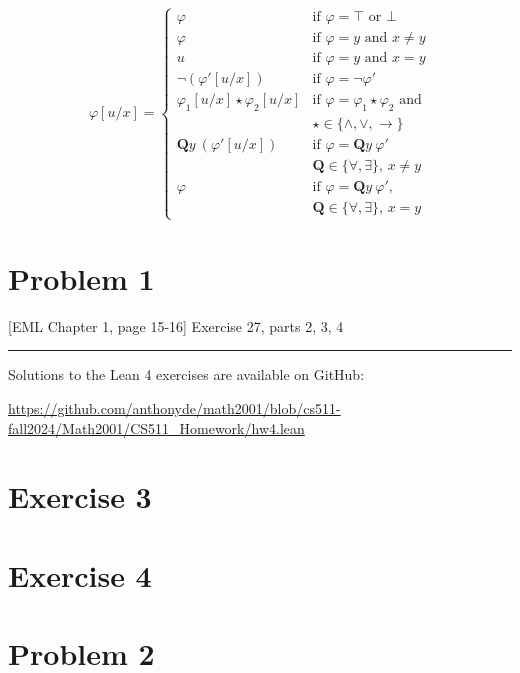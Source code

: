 \documentclass[12pt,leqno]{article}
\begin{document}
\[
  \varphi[u/x] = \left\{
    \begin{array}{ll}
    \varphi              & \text{if $\varphi = \top$ or $\bot$} \\
    \varphi              & \text{if $\varphi = y$ and $x \ne y$} \\
    u                    & \text{if $\varphi = y$ and $x = y$} \\
    \lnot(\varphi'[u/x]) & \text{if $\varphi = \lnot \varphi'$} \\
    \varphi_1[u/x] \star \varphi_2[u/x] &
      \text{if $\varphi = \varphi_1 \star \varphi_2$ and} \\
      & \text{$\star \in \{\land, \lor, \to\}$} \\
    \mathbf{Q}y\ (\varphi'[u/x])
      & \text{if $\varphi = \mathbf{Q}y\ \varphi'$} \\
      & \text{$\mathbf{Q} \in \{\forall, \exists\}$, $x \ne y$} \\
    \varphi & \text{if $\varphi = \mathbf{Q}y\ \varphi'$,} \\
      & \text{$\mathbf{Q} \in \{\forall, \exists\}$, $x = y$}
    \end{array}
  \right.
\]

\newpage
\section*{Problem 1}

[EML Chapter 1, page 15-16] Exercise 27, parts 2, 3, 4


\vspace{3\baselineskip}
\hrule

Solutions to the Lean 4 exercises are available on GitHub:

\url{https://github.com/anthonyde/math2001/blob/cs511-fall2024/Math2001/CS511_Homework/hw4.lean}

\section*{Exercise 3}

\section*{Exercise 4}

\section*{Problem 2}
\end{document}
